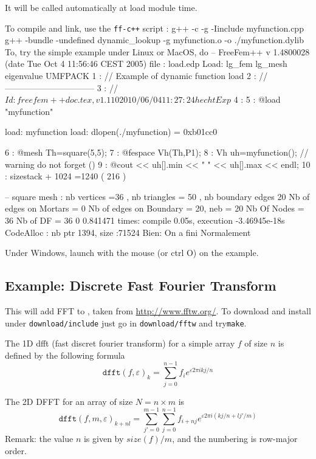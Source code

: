 \documentclass[a4paper,twoside,12pt]{book}
\begin{document}
It will be called automatically at load module time.

\medskip

To compile and link, use the \texttt{ff-c++} script :
\bFF
g++ -c -g -Iinclude myfunction.cpp
g++ -bundle -undefined dynamic_lookup -g myfunction.o -o ./myfunction.dylib
\eFF
To,  try the simple example under Linux or MacOS, do
\bFF
-- FreeFem++ v 1.4800028 (date Tue Oct  4 11:56:46 CEST 2005)
 file : load.edp
 Load: lg_fem lg_mesh eigenvalue  UMFPACK
    1 : // Example of dynamic function load
    2 : // --------------------------------
    3 : // $Id: freefem++doc.tex,v 1.110 2010/06/04 11:27:24 hecht Exp $
    4 :
    5 :  @load "myfunction"

load: myfunction
load: dlopen(./myfunction) = 0xb01cc0

    6 :  @mesh Th=square(5,5);
    7 :  @fespace Vh(Th,P1);
    8 :  Vh uh=myfunction(); // warning  do not forget ()
    9 :  @cout << uh[].min << " " << uh[].max << endl;
   10 :  sizestack + 1024 =1240  ( 216 )

 -- square mesh : nb vertices  =36 ,  nb triangles = 50 ,  nb boundary edges 20
 Nb of edges on Mortars  = 0
 Nb of edges on Boundary = 20, neb = 20
 Nb Of Nodes = 36
 Nb of DF = 36
0 0.841471
times: compile 0.05s, execution -3.46945e-18s
CodeAlloc : nb ptr  1394,  size :71524
Bien: On a fini Normalement
\eFF

Under Windows, launch \freefempp with the mouse (or ctrl O) on the example.

\subsection{Example: Discrete Fast Fourier Transform } 

This will add FFT to \freefempp, taken from
 \url{http://www.fftw.org/}. To download and install under \texttt{download/include}
 just go in \texttt{download/fftw} and try\texttt{make}.

 \medskip
 The 1D dfft (fast discret fourier transform)  for a  simple array  $f$ of size $n$
 is defined by the following formula
 $$
    \mathtt{dfft}(f,\varepsilon)_{k} = \sum_{j=0}^{n-1} f_i e^{\varepsilon  2\pi i kj/n}
 $$

 The 2D DFFT for an array of size $N=n\times m$ is
$$   \mathtt{dfft}(f,m,\varepsilon)_{k+nl} = \sum_{j'=0}^{m-1} \sum_{j=0}^{n-1} f_{i+nj} e^{\varepsilon  2\pi i (kj/n+lj'/m) }
 $$
 Remark: the value  $n$ is given  by $ size(f)/m$, and the numbering is  row-major order.
\end{document}
